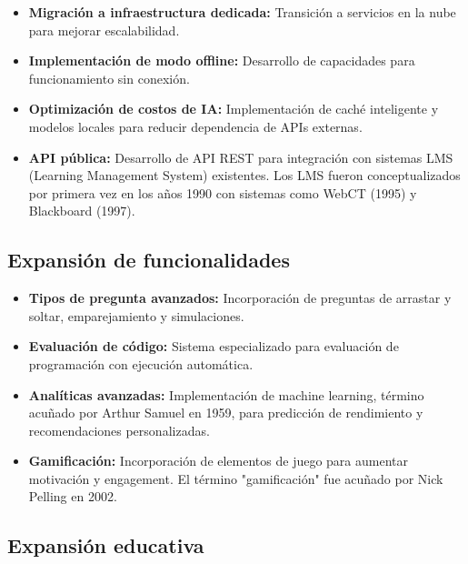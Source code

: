 \documentclass[12pt,a4paper]{report}
\begin{document}
\begin{itemize}
\item \textbf{Migración a infraestructura dedicada:} Transición a servicios en la nube para mejorar escalabilidad.

\item \textbf{Implementación de modo offline:} Desarrollo de capacidades para funcionamiento sin conexión.

\item \textbf{Optimización de costos de IA:} Implementación de caché inteligente y modelos locales para reducir dependencia de APIs externas.

\item \textbf{API pública:} Desarrollo de API REST para integración con sistemas LMS (Learning Management System) existentes. Los LMS fueron conceptualizados por primera vez en los años 1990 con sistemas como WebCT (1995) y Blackboard (1997).
\end{itemize}

\subsection{Expansión de funcionalidades}

\begin{itemize}
\item \textbf{Tipos de pregunta avanzados:} Incorporación de preguntas de arrastar y soltar, emparejamiento y simulaciones.

\item \textbf{Evaluación de código:} Sistema especializado para evaluación de programación con ejecución automática.

\item \textbf{Analíticas avanzadas:} Implementación de machine learning, término acuñado por Arthur Samuel en 1959, para predicción de rendimiento y recomendaciones personalizadas.

\item \textbf{Gamificación:} Incorporación de elementos de juego para aumentar motivación y engagement. El término "gamificación" fue acuñado por Nick Pelling en 2002.
\end{itemize}

\subsection{Expansión educativa}
\end{document}
